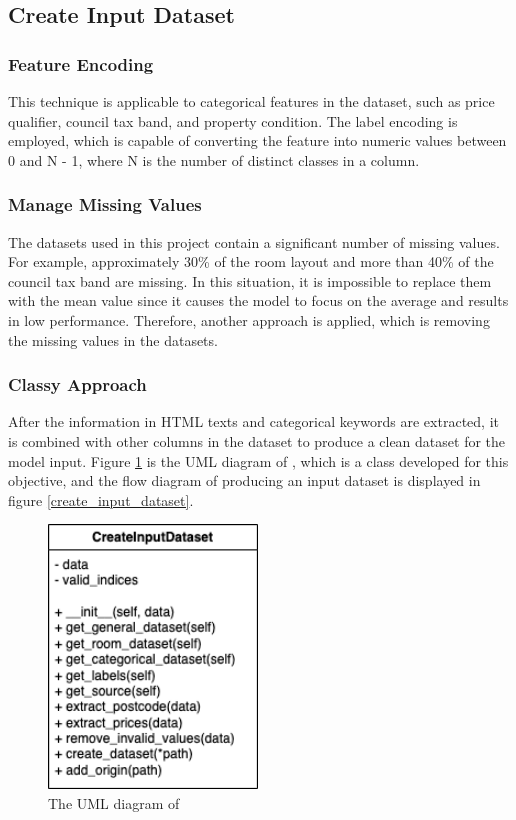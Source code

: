\documentclass[12pt,twoside]{report}
\begin{document}
\subsection{Create Input Dataset}
\label{create_input_dataset_section}
\subsubsection{Feature Encoding}
This technique is applicable to categorical features in the dataset, such as price qualifier, council tax band, and property condition. The label encoding is employed, which is capable of converting the feature into numeric values between 0 and N - 1, where N is the number of distinct classes in a column.

\subsubsection{Manage Missing Values}
The datasets used in this project contain a significant number of missing values. For example, approximately 30\% of the room layout and more than 40\% of the council tax band are missing. In this situation, it is impossible to replace them with the mean value since it causes the model to focus on the average and results in low performance. Therefore, another approach is applied, which is removing the missing values in the datasets. 

\subsubsection{Classy Approach}
After the information in HTML texts and categorical keywords are extracted, it is combined with other columns in the dataset to produce a clean dataset for the model input.  Figure \ref{uml_create_input_dataset} is the UML diagram of , which is a class developed for this objective, and the flow diagram of producing an input dataset is displayed in figure \ref{create_input_dataset}.

\begin{figure}[!htbp]
	\centering
	\includegraphics[height=7cm]{uml_create_input_dataset}
	\caption{The UML diagram of }
	\label{uml_create_input_dataset}
\end{figure}
\end{document}
